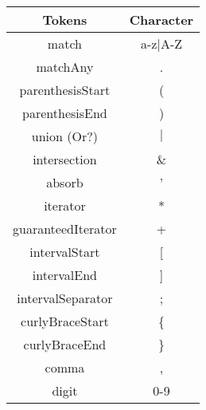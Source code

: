 \begin{tabular}{|c|c|}
    \hline
    \textbf{Tokens} & \textbf{Character}\\
    \hline
    match & a-z$\mid$A-Z\\
    \hline
    matchAny & .\\
    \hline
    parenthesisStart & (\\
    \hline
    parenthesisEnd & )\\
    \hline
    union (Or?) & $\mid$\\
    \hline
    intersection & \&\\
    \hline
    absorb & '\\
    \hline
    iterator & *\\
    \hline
    guaranteedIterator & +\\
    \hline
    intervalStart & [\\
    \hline
    intervalEnd & ]\\
    \hline
    intervalSeparator & ;\\
    \hline
    curlyBraceStart & \{\\
    \hline
    curlyBraceEnd & \}\\
    \hline
    comma & ,\\
    \hline
    digit & 0-9\\
    \hline
\end{tabular}